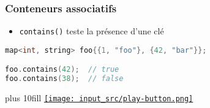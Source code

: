 \documentclass[C++.tex]{subfiles}
\begin{document}
\begin{frame}[fragile]
	\frametitle{Conteneurs associatifs}
	\begin{itemize}
		\item \lstinline|contains()| teste la présence d'une clé
	\end{itemize}

	\begin{lstlisting}[language=C++]
map<int, string> foo{{1, "foo"}, {42, "bar"}};

foo.contains(42);  // true
foo.contains(38);  // false\end{lstlisting}

	\vskip 10mm plus 10fill
	\hfill
	\href{https://godbolt.org/#g:!((g:!((g:!((h:codeEditor,i:(filename:'1',fontScale:14,fontUsePx:'0',j:1,lang:c%2B%2B,selection:(endColumn:1,endLineNumber:13,positionColumn:1,positionLineNumber:13,selectionStartColumn:1,selectionStartLineNumber:1,startColumn:1,startLineNumber:1),source:'%23include+%3Cmap%3E%0A%23include+%3Cstring%3E%0A%23include+%3Ciostream%3E%0A%0Aint+main()%0A%7B%0A++std::map%3Cint,+std::string%3E+foo%7B%7B1,+%22foo%22%7D,+%7B42,+%22bar%22%7D%7D%3B%0A%0A++std::cout+%3C%3C+std::boolalpha%3B%0A++std::cout+%3C%3C+foo.contains(42)+%3C%3C+%22%5Cn%22%3B%0A++std::cout+%3C%3C+foo.contains(38)+%3C%3C+%22%5Cn%22%3B%0A%7D%0A'),l:'5',n:'0',o:'C%2B%2B+source+%231',t:'0')),k:50,l:'4',n:'0',o:'',s:0,t:'0'),(g:!((h:executor,i:(argsPanelShown:'1',compilationPanelShown:'0',compiler:g122,compilerName:'',compilerOutShown:'0',execArgs:'',execStdin:'',fontScale:14,fontUsePx:'0',j:1,lang:c%2B%2B,libs:!((name:boost,ver:'175')),options:'-std%3Dc%2B%2B20+-Wall+-Wextra+-pedantic',source:1,stdinPanelShown:'1',tree:'1',wrap:'0'),l:'5',n:'0',o:'Executor+x86-64+gcc+12.2+(C%2B%2B,+Editor+%231)',t:'0')),header:(),k:50,l:'4',n:'0',o:'',s:0,t:'0')),l:'2',n:'0',o:'',t:'0')),version:4}{\texttt{[image: input\_src/play-button.png]}}
\end{frame}
\end{document}
